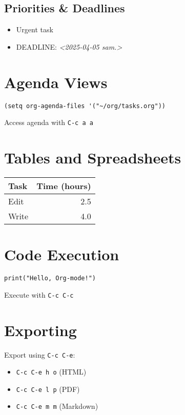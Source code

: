 \documentclass[11pt]{article}
\begin{document}
\subsection{Priorities \& Deadlines}
\label{sec:org872f9f2}
\begin{itemize}
\item\relax [\#A] Urgent task
\item DEADLINE: \textit{<2025-04-05 sam.>}
\end{itemize}

\section{Agenda Views}
\label{sec:org136cc7d}
\begin{verbatim}
(setq org-agenda-files '("~/org/tasks.org"))
\end{verbatim}
Access agenda with \texttt{C-c a a}

\section{Tables and Spreadsheets}
\label{sec:orgf5d1b3c}
\begin{center}
\begin{tabular}{lr}
Task & Time (hours)\\
\hline
Edit & 2.5\\
Write & 4.0\\
\end{tabular}
\end{center}

\section{Code Execution}
\label{sec:org4664773}
\begin{verbatim}
print("Hello, Org-mode!")
\end{verbatim}

Execute with \texttt{C-c C-c}

\section{Exporting}
\label{sec:orgde84faf}
Export using \texttt{C-c C-e}:
\begin{itemize}
\item \texttt{C-c C-e h o} (HTML)
\item \texttt{C-c C-e l p} (PDF)
\item \texttt{C-c C-e m m} (Markdown)
\end{itemize}
\end{document}

